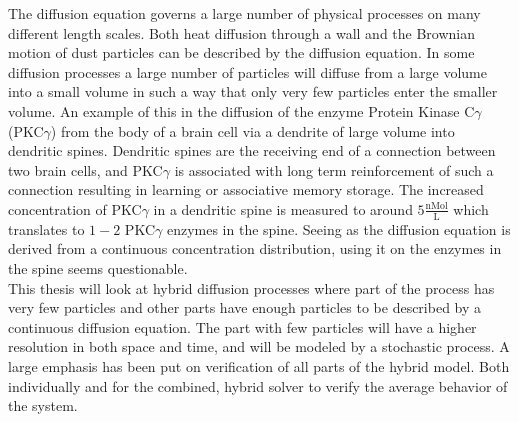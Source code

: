 The diffusion equation governs a large number of physical processes on many different length scales. 
Both heat diffusion through a wall and the Brownian motion of dust particles can be described by the diffusion equation. 
In some diffusion processes a large number of particles will diffuse from a large volume into a small volume in such a way that only very few particles enter the smaller volume. 
An example of this in the diffusion of the enzyme Protein Kinase C$\gamma$ (PKC$\gamma$) from the body of a brain cell via a dendrite of large volume into dendritic spines. 
Dendritic spines are the receiving end of a connection between two brain cells, and PKC$\gamma$ is associated with long term reinforcement of such a connection resulting in learning or associative memory storage. 
The increased concentration of PKC$\gamma$ in a dendritic spine is measured to around $5\frac{\text{nMol}}{\text{L}}$ which translates to $1-2$ PKC$\gamma$ enzymes in the spine. 
Seeing as the diffusion equation is derived from a continuous concentration distribution, using it on the enzymes in the spine seems questionable. \\

This thesis will look at hybrid diffusion processes where part of the process has very few particles and other parts have enough particles to be described by a continuous diffusion equation. 
The part with few particles will have a higher resolution in both space and time, and will be modeled by a stochastic process. 
A large emphasis has been put on verification of all parts of the hybrid model. 
Both individually and for the combined, hybrid solver to verify the average behavior of the system.
